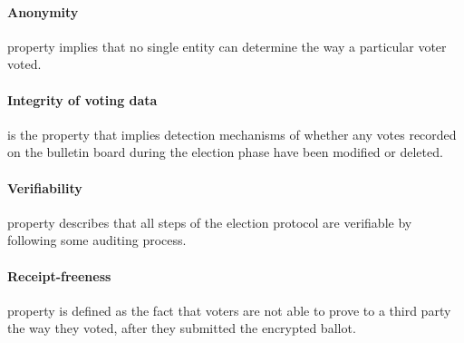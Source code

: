 \paragraph{Anonymity} property implies that no single entity can determine the way a particular voter voted.

\paragraph{Integrity of voting data} is the property that implies detection mechanisms of whether any votes recorded on the bulletin board during the election phase have been modified or deleted.

\paragraph{Verifiability} property describes that all steps of the election protocol are verifiable by following some auditing process.

\paragraph{Receipt-freeness} property is defined as the fact that voters are not able to prove to a third party the way they voted, after they submitted the encrypted ballot.
